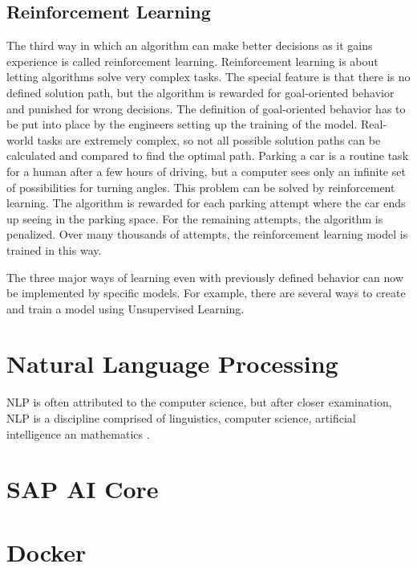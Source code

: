 \subsection{Reinforcement Learning}
The third way in which an algorithm can make better decisions as it gains experience is called reinforcement learning. Reinforcement learning is about letting algorithms solve very complex tasks. The special feature is that there is no defined solution path, but the algorithm is rewarded for goal-oriented behavior and punished for wrong decisions. The definition of goal-oriented behavior has to be put into place by the engineers setting up the training of the model. Real-world tasks are extremely complex, so not all possible solution paths can be calculated and compared to find the optimal path. Parking a car is a routine task for a human after a few hours of driving, but a computer sees only an infinite set of possibilities for turning angles. This problem can be solved by reinforcement learning. The algorithm is rewarded for each parking attempt where the car ends up seeing in the parking space. For the remaining attempts, the algorithm is penalized. Over many thousands of attempts, the reinforcement learning model is trained in this way.

The three major ways of learning even with previously defined behavior can now be implemented by specific models. For example, there are several ways to create and train a model using Unsupervised Learning.

\section{Natural Language Processing}
\ac{NLP} is often attributed to the computer science, but after closer examination, \ac{NLP} is a discipline comprised of linguistics, computer science, artificial intelligence an mathematics \cite{gobinda_g_chowdhury_natural_2003}.

\section{SAP AI Core}
\section{Docker}
